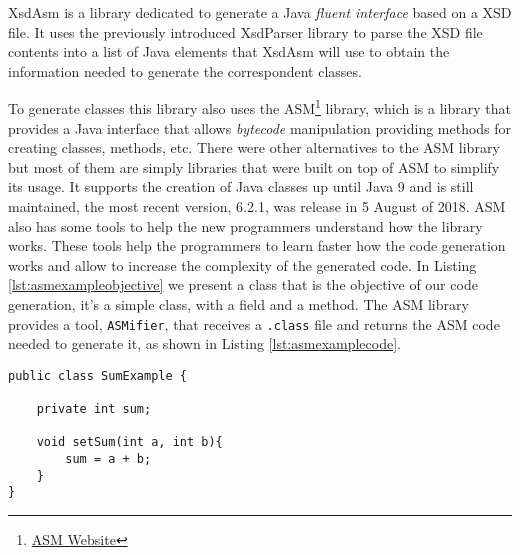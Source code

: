 XsdAsm is a library dedicated to generate a Java \textit{fluent interface} based on a \ac{XSD} file. It uses the previously introduced XsdParser library to parse the \ac{XSD} file contents into a list of Java elements that XsdAsm will use to obtain the information needed to generate the correspondent classes. 

\noindent
To generate classes this library also uses the ASM\footnote{\href{http://asm.ow2.org/}{ASM Website}} library, which is a library that provides a Java interface that allows \textit{bytecode} manipulation providing methods for creating classes, methods, etc. There were other alternatives to the ASM library but most of them are simply libraries that were built on top of ASM to simplify its usage. It supports the creation of Java classes up until Java 9 and is still maintained, the most recent version, 6.2.1, was release in 5 August of 2018. ASM also has some tools to help the new programmers understand how the library works. These tools help the programmers to learn faster how the code generation works and allow to increase the complexity of the generated code. In Listing \ref{lst:asmexampleobjective} we present a class that is the objective of our code generation, it's a simple class, with a field and a method. The ASM library provides a tool, \texttt{ASMifier}, that receives a \texttt{.class} file and returns the ASM code needed to generate it, as shown in Listing \ref{lst:asmexamplecode}.

\bigskip


\begin{minipage}{\linewidth}
\begin{lstlisting}[caption={ASM Example - Objective},captionpos=b,label={lst:asmexampleobjective}]
public class SumExample {

    private int sum;

    void setSum(int a, int b){
        sum = a + b;
    }
}
\end{lstlisting}
\end{minipage}

\bigskip


